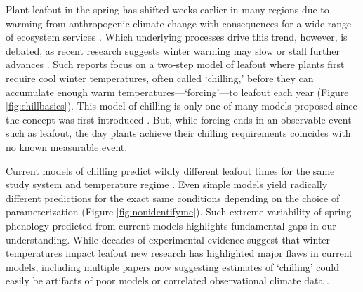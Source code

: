 \documentclass[11pt]{article}
\begin{document}

\newpage
Plant leafout in the spring has shifted weeks earlier in many regions due to warming from anthropogenic climate change with consequences for a wide range of ecosystem services \citep{keenan2014net,ipcc2022}. Which underlying processes drive this trend, however, is debated, as recent research suggests winter warming may slow or stall further advances \citep{fu2015,piao2017}. Such reports focus on a two-step model of leafout where plants first require cool winter temperatures, often called `chilling,' before they can accumulate enough warm temperatures---`forcing'---to leafout each year (Figure \ref{fig:chillbasics}). This model of chilling is only one of many models proposed since the concept was first introduced \citep[][]{basler2016evaluating,hufkens2018integrated,spafford2025stability}. But, while forcing ends in an observable event such as leafout, the day plants achieve their chilling requirements coincides with no known measurable event. %

Current models of chilling predict wildly different leafout times for the same study system and temperature regime \citep{guy2014,chuine2016}. 
Even simple models yield radically different predictions for the exact same conditions depending on the choice of parameterization (Figure \ref{fig:nonidentifyme}). Such extreme variability of spring phenology predicted from current models highlights fundamental gaps in our understanding. While decades of experimental evidence suggest that winter temperatures impact leafout \citep{charrier2015,baum2021} new research has highlighted major flaws in current models, including multiple papers now suggesting estimates of `chilling' could easily be artifacts of poor models or correlated observational climate data \citep{decsens,gao2024}. 
\end{document}
